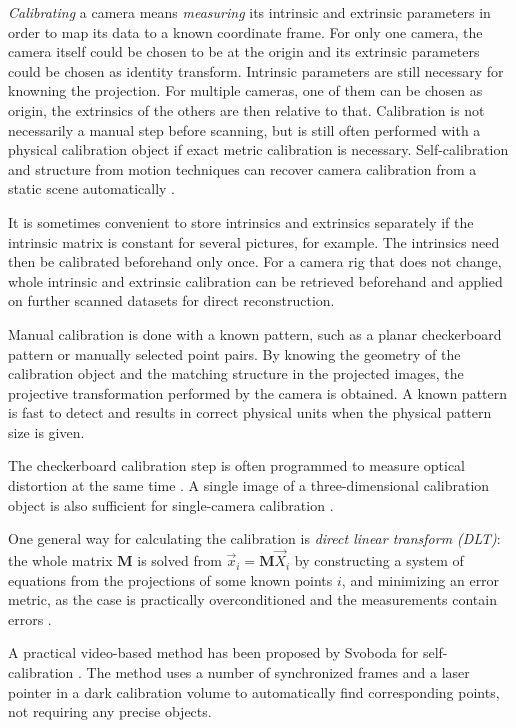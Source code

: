 \emph{Calibrating} a camera means \emph{measuring} its intrinsic and extrinsic parameters in order to map its data to a known coordinate frame.
For only one camera, the camera itself could be chosen to be at the origin and its extrinsic parameters could be chosen as identity transform.
Intrinsic parameters are still necessary for knowning the projection.
For multiple cameras, one of them can be chosen as origin, the extrinsics of the others are then relative to that.
Calibration is not necessarily a manual step before scanning, but is still often performed with a physical calibration object if exact metric calibration is necessary.
Self-calibration and structure from motion techniques can recover camera calibration from a static scene automatically \cite{pollefeys1999hand,hartley03multiview}.

It is sometimes convenient to store intrinsics and extrinsics separately if the intrinsic matrix is constant for several pictures, for example.
The intrinsics need then be calibrated beforehand only once.
For a camera rig that does not change, whole intrinsic and extrinsic calibration can be retrieved beforehand and applied on further scanned datasets for direct reconstruction.

Manual calibration is done with a known pattern, such as a planar checkerboard pattern \cite{chuang2002performance,zhang2000flexible} or manually selected point pairs.
By knowing the geometry of the calibration object and the matching structure in the projected images, the projective transformation performed by the camera is obtained.
A known pattern is fast to detect and results in correct physical units when the physical pattern size is given.

The checkerboard calibration step is often programmed to measure optical distortion at the same time \cite{opencv,camcalmatlab}.
A single image of a three-dimensional calibration object is also sufficient for single-camera calibration \cite[p.~181]{hartley03multiview}.

One general way for calculating the calibration is \emph{direct linear transform (DLT)}:
the whole matrix $\bm M$ is solved from $\vec x_i = \bm M \vec X_i$ by constructing a system of equations from the projections of some known points $i$, and minimizing an error metric, as the case is practically overconditioned and the measurements contain errors \cite{hartley03multiview}.

A practical video-based method has been proposed by Svoboda for self-calibration \cite{svoboda2005convenient}.
The method uses a number of synchronized frames and a laser pointer in a dark calibration volume to automatically find corresponding points, not requiring any precise objects.

